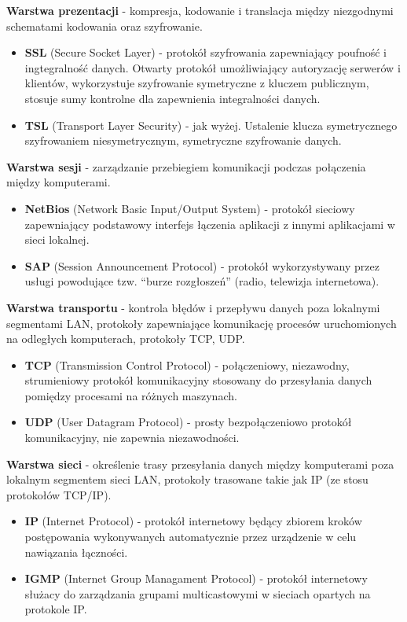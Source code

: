 \documentclass[12pt]{article}
\begin{document}
    \noindent \textbf{Warstwa prezentacji} - kompresja, kodowanie i
    translacja między niezgodnymi schematami kodowania oraz szyfrowanie.
    \begin{itemize}
        \item \textbf{SSL} (Secure Socket Layer) - protokół szyfrowania zapewniający poufność i ingtegralność danych.
        Otwarty protokół umożliwiający autoryzację serwerów i klientów, wykorzystuje szyfrowanie symetryczne
        z kluczem publicznym, stosuje sumy kontrolne dla zapewnienia integralności danych.
        \item \textbf{TSL} (Transport Layer Security) - jak wyżej. Ustalenie klucza symetrycznego szyfrowaniem niesymetrycznym,
        symetryczne szyfrowanie danych.
    \end{itemize}

    \noindent \textbf{Warstwa sesji} - zarządzanie przebiegiem komunikacji podczas
    połączenia między komputerami.
    \begin{itemize}
        \item \textbf{NetBios} (Network Basic Input/Output System) - protokół sieciowy zapewniający podstawowy interfejs
        łączenia aplikacji z innymi aplikacjami w sieci lokalnej.
        \item \textbf{SAP} (Session Announcement Protocol) - protokół wykorzystywany przez usługi powodujące tzw.
        ``burze rozgłoszeń'' (radio, telewizja internetowa).
    \end{itemize}

    \noindent \textbf{Warstwa transportu} - kontrola błędów i przepływu danych
    poza lokalnymi segmentami LAN, protokoły zapewniające
    komunikację procesów uruchomionych na odległych komputerach, protokoły TCP, UDP.
    \begin{itemize}
        \item \textbf{TCP} (Transmission Control Protocol) - połączeniowy, niezawodny, strumieniowy protokół komunikacyjny
        stosowany do przesyłania danych pomiędzy procesami na różnych maszynach.
        \item \textbf{UDP} (User Datagram Protocol) - prosty bezpołączeniowo protokół komunikacyjny, nie zapewnia
        niezawodności.
    \end{itemize}

    \noindent \textbf{Warstwa sieci} - określenie trasy przesyłania
    danych między komputerami poza lokalnym segmentem sieci LAN, protokoły trasowane takie jak IP (ze stosu protokołów TCP/IP).
    \begin{itemize}
        \item \textbf{IP} (Internet Protocol) - protokół internetowy będący zbiorem kroków
        postępowania wykonywanych automatycznie przez urządzenie w celu nawiązania łączności.
        \item \textbf{IGMP} (Internet Group Managament Protocol) - protokół internetowy służacy do zarządzania
        grupami multicastowymi w sieciach opartych na protokole IP.
    \end{itemize}
\end{document}
